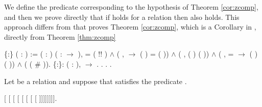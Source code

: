     We define the predicate  corresponding to the
    hypothesis of Theorem \ref{cor:zcomp}, and then we prove
    directly that if  holds for a relation  then 
     also holds. This approach differs from
    \cite{Nakazawa-Fujita2016} that proves Theorem
    \ref{cor:zcomp}, which is a Corollary in \cite{Nakazawa-Fujita2016}, 
    directly from Theorem \ref{thm:zcomp} \begin{coqdoccode}
\coqdocemptyline
\coqdocnoindent
{}  \{:\} ( : ) := \coqdoctac{\ensuremath{\exists}} ( :  ) ( :  \ensuremath{\rightarrow} ),  = ( !\coqdocvar{\_}! ) \ensuremath{\land} (\coqdockw{\ensuremath{\forall}}  ,    \ensuremath{\rightarrow} ( ) = ( )) \ensuremath{\land} (\coqdockw{\ensuremath{\forall}} , ( )  ( )) \ensuremath{\land} (\coqdockw{\ensuremath{\forall}}  ,  =   \ensuremath{\rightarrow} ( )  ( )) \ensuremath{\land} (   ( \# )).\coqdoceol
\coqdocemptyline
\coqdocnoindent
{}  \{:\}: \coqdockw{\ensuremath{\forall}} ( :  ),   \ensuremath{\rightarrow}  .\coqdoceol
\coqdocnoindent
{}.\coqdoceol
\coqdocindent{1.00em}
  .    . \end{coqdoccode}
Let  be a relation
  and suppose that  satisfies the predicate . \begin{coqdoccode}
\coqdocemptyline
\coqdocindent{1.00em}
   [ [ [ [ [ [ [ [ ]]]]]]]]. \end{coqdoccode}
